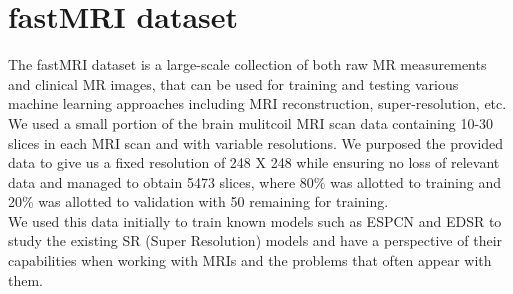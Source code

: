 \section{fastMRI dataset}\label{sec:3_2}

The fastMRI dataset \cite{zbontar2019fastmri} is a large-scale collection of both raw MR measurements and clinical MR images, that can be used for training and testing various machine learning approaches including MRI reconstruction, super-resolution, etc.\\

We used a small portion of the brain mulitcoil MRI scan data containing 10-30 slices in each MRI scan and with variable resolutions. We purposed the provided data to give us a fixed resolution of 248 X 248 while ensuring no loss of relevant data and managed to obtain 5473 slices, where 80\% was allotted to training and 20\% was allotted to validation with 50 remaining for training.\\

We used this data initially to train known models such as ESPCN and EDSR to study the existing SR (Super Resolution) models and have a perspective of their capabilities when working with MRIs and the problems that often appear with them.\\

